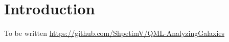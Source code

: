 

\chapter{Introduction} %

\label{Chapter1}

To be written
\url{https://github.com/ShpetimV/QML-AnalyzingGalaxies}
